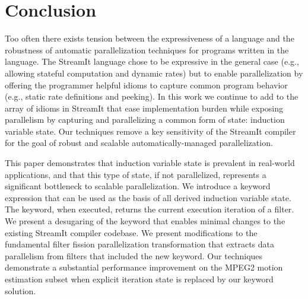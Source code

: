\section{Conclusion}
\label{sec:conclusion}

Too often there exists tension between the expressiveness of a
language and the robustness of automatic parallelization techniques
for programs written in the language. The StreamIt language chose to
be expressive in the general case (e.g., allowing stateful computation
and dynamic rates) but to enable parallelization by offering the
programmer helpful idioms to capture common program behavior (e.g.,
static rate definitions and peeking). In this work we continue to add
to the array of idioms in StreamIt that ease implementation burden
while exposing parallelism by capturing and parallelizing a common
form of state: induction variable state.  Our techniques remove a key
sensitivity of the StreamIt compiler for the goal of robust and
scalable automatically-managed parallelization.

This paper demonstrates that induction variable state is prevalent in
real-world applications, and that this type of state, if not
parallelized, represents a significant bottleneck to scalable
parallelization. We introduce a keyword expression that can be used as
the basis of all derived induction variable state. The keyword, when
executed, returns the current execution iteration of a filter. We
present a desugaring of the keyword that enables minimal changes to
the existing StreamIt compiler codebase. We present modifications to
the fundamental filter fission parallelization transformation that
extracts data parallelism from filters that included the new keyword.
Our techniques demonstrate a substantial performance improvement on
the MPEG2 motion estimation subset when explicit iteration state is
replaced by our keyword solution.


%

